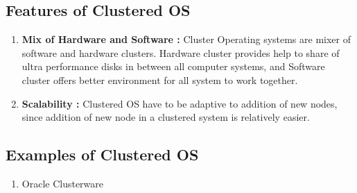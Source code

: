 \documentclass{article}
\begin{document}
\subsection{Features of Clustered OS}
\begin{enumerate}
    \item \textbf{Mix of Hardware and Software :}
    Cluster Operating systems are mixer of software and hardware clusters. Hardware cluster provides help to share of ultra performance disks in between all computer systems, and Software cluster offers better environment for all system to work together.
    \item \textbf{Scalability :}
    Clustered OS have to be adaptive to addition of new nodes, since addition of new node in a clustered system is relatively easier. 
\end{enumerate}
\subsection{Examples of Clustered OS}
\begin{enumerate}
    \item Oracle Clusterware
\end{enumerate}
\end{document}
